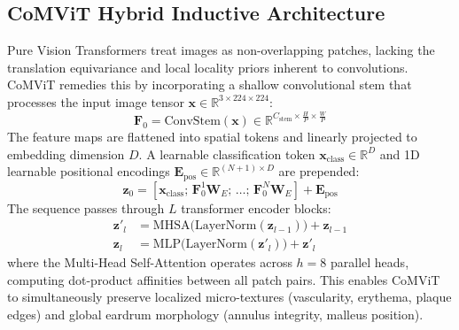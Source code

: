 \documentclass[12pt,a4paper]{report}
\begin{document}
\subsection{CoMViT Hybrid Inductive Architecture}
Pure Vision Transformers treat images as non-overlapping patches, lacking the translation equivariance and local locality priors inherent to convolutions. CoMViT remedies this by incorporating a shallow convolutional stem that processes the input image tensor $\mathbf{x} \in \mathbb{R}^{3 \times 224 \times 224}$:
\begin{equation}
    \mathbf{F}_0 = \mathrm{ConvStem}(\mathbf{x}) \in \mathbb{R}^{C_{\text{stem}} \times \frac{H}{P} \times \frac{W}{P}}
\end{equation}
The feature maps are flattened into spatial tokens and linearly projected to embedding dimension $D$. A learnable classification token $\mathbf{x}_{\text{class}} \in \mathbb{R}^D$ and 1D learnable positional encodings $\mathbf{E}_{\text{pos}} \in \mathbb{R}^{(N+1) \times D}$ are prepended:
\begin{equation}
    \mathbf{z}_0 = [\mathbf{x}_{\text{class}}; \, \mathbf{F}_0^1 \mathbf{W}_E; \, \dots; \, \mathbf{F}_0^N \mathbf{W}_E] + \mathbf{E}_{\text{pos}}
\end{equation}
The sequence passes through $L$ transformer encoder blocks:
\begin{align}
    \mathbf{z}'_l &= \mathrm{MHSA}\big(\mathrm{LayerNorm}(\mathbf{z}_{l-1})\big) + \mathbf{z}_{l-1} \\
    \mathbf{z}_l &= \mathrm{MLP}\big(\mathrm{LayerNorm}(\mathbf{z}'_l)\big) + \mathbf{z}'_l
\end{align}
where the Multi-Head Self-Attention operates across $h=8$ parallel heads, computing dot-product affinities between all patch pairs. This enables CoMViT to simultaneously preserve localized micro-textures (vascularity, erythema, plaque edges) and global eardrum morphology (annulus integrity, malleus position).
\end{document}
